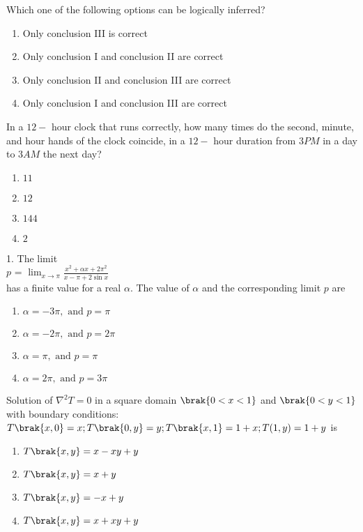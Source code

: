 Which one of the following options can be logically inferred? 
    \begin{enumerate}
        \item Only conclusion III is correct
        \item Only conclusion I and conclusion II are correct
        \item Only conclusion II and conclusion III are correct
        \item Only conclusion I and conclusion III are correct
    \end{enumerate}
    \item In a $12-$ hour clock that runs correctly, how many times do the second, minute, and hour hands of the clock coincide, in a $12-$ hour duration from $3PM$ in a day to $3AM$ the next day?
    \begin{enumerate}
        \item $11$
        \item $12$
        \item $144$
        \item $2$
    \end{enumerate} 
    \item 1. The limit\\
$p$ = $\displaystyle \lim_{x \to \pi} \frac{x^{2} + \alpha x + 2\pi^{2}}{x - \pi + 2\sin x}$\\ has a finite value for a real $\alpha$. The value of $\alpha$ and the corresponding limit $p$ are 
    \begin{enumerate}
        \item $\alpha = -3\pi, \text{ and } p = \pi$
        \item $\alpha = -2\pi, \text{ and } p = 2\pi $
        \item $\alpha = \pi, \text{ and } p = \pi$ 
        \item $\alpha = 2\pi, \text{ and } p = 3\pi$
    \end{enumerate}
    \item Solution of $\nabla^{2} T = 0$ in a square domain $\brak{0 < x < 1}$  and  $\brak{0 < y < 1}$ with boundary conditions:\\$T\brak{x, 0} = x; T\brak{0, y} = y; T\brak{x, 1} = 1 + x; T(1, y) = 1 + y$ is
    \begin{enumerate}
        \item $T\brak{x,y}=x-xy+y$
        \item $T\brak{x,y}=x+y$
        \item $T\brak{x,y}=-x+y$
        \item $T\brak{x,y}=x+xy+y$
    \end{enumerate}
